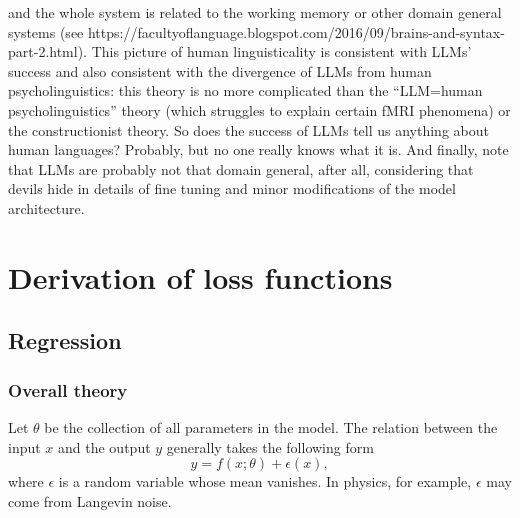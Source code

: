 \documentclass[hyperref, a4paper, 12pt]{report}
\begin{document}
and the whole system is related to the working memory or other domain general systems (see https://facultyoflanguage.blogspot.com/2016/09/brains-and-syntax-part-2.html).
This picture of human linguisticality is consistent with LLMs' success
and also consistent with the divergence of LLMs from human psycholinguistics:
this theory is no more complicated than the ``LLM=human psycholinguistics'' theory (which struggles to explain certain fMRI phenomena) or the constructionist theory.
So does the success of LLMs tell us anything about human languages?
Probably, but no one really knows what it is.
And finally, note that LLMs are probably not that domain general, after all,
considering that devils hide in details of fine tuning and minor modifications of the model architecture.

\chapter{Derivation of loss functions}\label{chap:loss}

\section{Regression}

\subsection{Overall theory}

Let $\theta$ be the collection of all parameters in the model.
The relation between the input $x$ and the output $y$ generally takes the following form
\begin{equation}
    y = f(x; \theta) + \epsilon(x),
\end{equation}
where $\epsilon$ is a random variable whose mean vanishes.
In physics, for example, $\epsilon$ may come from Langevin noise.
\end{document}
